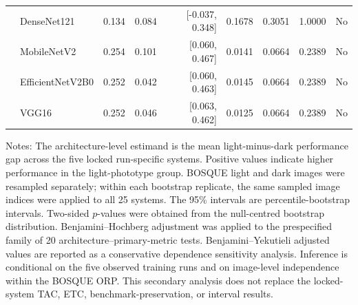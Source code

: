 \begin{table}[h!]
\begin{tabular}{llrrrrrrl}
 & DenseNet121 & 0.134 & 0.084 & [-0.037, 0.348] & 0.1678 & 0.3051 & 1.0000 & No \\
 & MobileNetV2 & 0.254 & 0.101 & [0.060, 0.467] & 0.0141 & 0.0664 & 0.2389 & No \\
 & EfficientNetV2B0 & 0.252 & 0.042 & [0.060, 0.463] & 0.0145 & 0.0664 & 0.2389 & No \\
 & VGG16 & 0.252 & 0.046 & [0.063, 0.462] & 0.0125 & 0.0664 & 0.2389 & No \\
\bottomrule
\end{tabular}
\begin{flushleft}
\footnotesize Notes: The architecture-level estimand is the mean light-minus-dark performance gap across the five locked run-specific systems. Positive values indicate higher performance in the light-phototype group. BOSQUE light and dark images were resampled separately; within each bootstrap replicate, the same sampled image indices were applied to all 25 systems. The 95\% intervals are percentile-bootstrap intervals. Two-sided $p$-values were obtained from the null-centred bootstrap distribution. Benjamini--Hochberg adjustment was applied to the prespecified family of 20 architecture--primary-metric tests. Benjamini--Yekutieli adjusted values are reported as a conservative dependence sensitivity analysis. Inference is conditional on the five observed training runs and on image-level independence within the BOSQUE ORP. This secondary analysis does not replace the locked-system TAC, ETC, benchmark-preservation, or interval results.
\end{flushleft}
\end{table}
